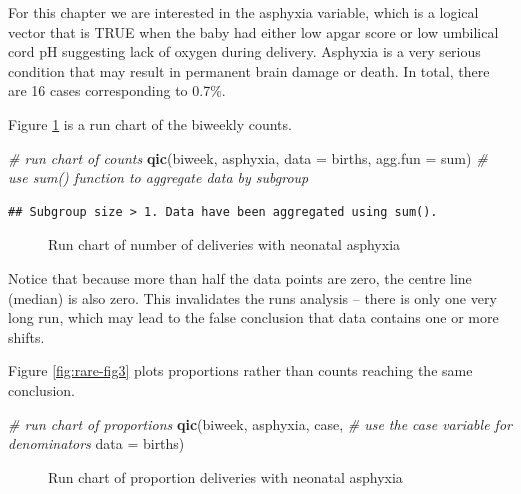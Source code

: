 \documentclass[
]{book}
\makeatletter
\newenvironment{Shaded}{\begin{snugshade}}{\end{snugshade}}
\newcommand{\AttributeTok}[1]{\textcolor[rgb]{0.13,0.29,0.53}{#1}}
\newcommand{\CommentTok}[1]{\textcolor[rgb]{0.56,0.35,0.01}{\textit{#1}}}
\newcommand{\FunctionTok}[1]{\textcolor[rgb]{0.13,0.29,0.53}{\textbf{#1}}}
\newcommand{\NormalTok}[1]{#1}
\newcommand{\StringTok}[1]{\textcolor[rgb]{0.31,0.60,0.02}{#1}}
\newcommand*\pandocbounded[1]{%
  \sbox\pandoc@box{#1}%
  \Gscale@div\@tempa{\textheight}{\dimexpr\ht\pandoc@box+\dp\pandoc@box\relax}%
  \Gscale@div\@tempb{\linewidth}{\wd\pandoc@box}%
  \ifdim\@tempb\p@<\@tempa\p@\let\@tempa\@tempb\fi%
  \ifdim\@tempa\p@<\p@\scalebox{\@tempa}{\usebox\pandoc@box}%
  \else\usebox{\pandoc@box}%
  \fi%
}
\makeatother
\begin{document}
For this chapter we are interested in the asphyxia variable, which is a logical vector that is TRUE when the baby had either low apgar score or low umbilical cord pH suggesting lack of oxygen during delivery. Asphyxia is a very serious condition that may result in permanent brain damage or death. In total, there are 16 cases corresponding to 0.7\%.

Figure \ref{fig:rare-fig1} is a run chart of the biweekly counts.

\begin{Shaded}
\begin{Highlighting}[]
\CommentTok{\# run chart of counts}
\FunctionTok{qic}\NormalTok{(biweek, asphyxia, }
    \AttributeTok{data    =}\NormalTok{ births, }
    \AttributeTok{agg.fun =} \StringTok{\textquotesingle{}sum\textquotesingle{}}\NormalTok{)  }\CommentTok{\# use sum() function to aggregate data by subgroup}
\end{Highlighting}
\end{Shaded}

\begin{verbatim}
## Subgroup size > 1. Data have been aggregated using sum().
\end{verbatim}

\begin{figure}
\centering
\pandocbounded{}
\caption{\label{fig:rare-fig1}Run chart of number of deliveries with neonatal asphyxia}
\end{figure}

Notice that because more than half the data points are zero, the centre line (median) is also zero. This invalidates the runs analysis -- there is only one very long run, which may lead to the false conclusion that data contains one or more shifts.

Figure \ref{fig:rare-fig3} plots proportions rather than counts reaching the same conclusion.

\begin{Shaded}
\begin{Highlighting}[]
\CommentTok{\# run chart of proportions}
\FunctionTok{qic}\NormalTok{(biweek, asphyxia, case,  }\CommentTok{\# use the case variable for denominators}
    \AttributeTok{data =}\NormalTok{ births)}
\end{Highlighting}
\end{Shaded}

\begin{figure}
\centering
\pandocbounded{}
\caption{\label{fig:rare-fig2}Run chart of proportion deliveries with neonatal asphyxia}
\end{figure}
\end{document}
